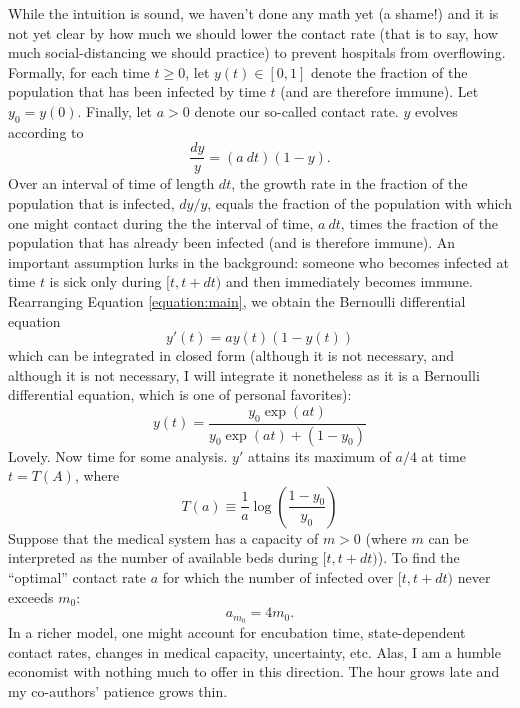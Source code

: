 \documentclass[12pt]{article}
\begin{document}
While the intuition is sound, we haven't done any math yet (a shame!) and it is not yet clear by how much we should lower the contact rate (that is to say, how much social-distancing we should practice) to prevent hospitals from overflowing. Formally, for each time $t\geq0$, let $y(t)\in[0,1]$ denote the fraction of the population that has been infected by time $t$ (and are therefore immune). Let $y_{0}=y(0)$. Finally, let $a>0$ denote our so-called contact rate. $y$ evolves according to
\begin{equation}\label{equation:main}
	\frac{dy}{y}=(a\: dt)(1-y). 
\end{equation}
Over an interval of time of length $dt$, the growth rate in the fraction of the population that is infected, $dy/y$, equals the fraction of the population with which one might contact during the the interval of time, $a\: dt$, times the fraction of the population that has already been infected (and is therefore immune). An important assumption lurks in the background: someone who becomes infected at time $t$ is sick only during $[t,t+dt)$ and then immediately becomes immune. Rearranging Equation \ref{equation:main}, we obtain the Bernoulli differential equation 
\begin{equation}
	y'(t)=ay(t)(1-y(t))
\end{equation} 
which can be integrated in closed form (although it is not necessary, and although it is not necessary, I will integrate it nonetheless as it is a Bernoulli differential equation, which is one of personal favorites):
\begin{equation}
	y(t)=\frac{y_{0}\exp(at)}{y_{0}\exp(at)+(1-y_{0})}
\end{equation}
Lovely. Now time for some analysis. $y'$ attains its maximum of $a/4$ at time $t=T(A)$, where
\begin{equation}
	T(a)\equiv\frac{1}{a}\log\left(\frac{1-y_{0}}{y_{0}}\right)
\end{equation}
Suppose that the medical system has a capacity of $m>0$ (where $m$ can be interpreted as the number of available beds during $[t,t+dt)$). To find the ``optimal'' contact rate $a$ for which the number of infected over $[t,t+dt)$ never exceeds $m_{0}$:
\begin{equation}
	a_{m_{0}}=4m_{0}.
\end{equation}
In a richer model, one might account for encubation time, state-dependent contact rates, changes in medical capacity, uncertainty, etc. Alas, I am a humble economist with nothing much to offer in this direction. The hour grows late and my co-authors' patience grows thin.
\end{document}
